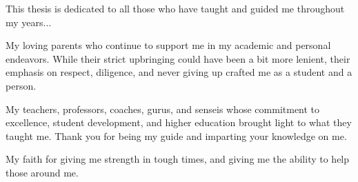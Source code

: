 \documentclass[12pt,american]{report}
\begin{document}
\copyrightfalse%
{}

\beforepreface%

\vfill
\begin{center}
This thesis is dedicated to all those who have taught and guided me throughout my years... 


My loving parents who continue to support me in my academic and personal endeavors.  While their strict upbringing could have been a bit more lenient, their emphasis on respect, diligence, and never giving up crafted me as a student and a person.  


My teachers, professors, coaches, gurus, and senseis whose commitment to excellence, student development, and higher education brought light to what they taught me.  Thank you for being my guide and imparting your knowledge on me.


My faith for giving me strength in tough times, and giving me the ability to help those around me.
\end{center}
\vfill
\end{document}
